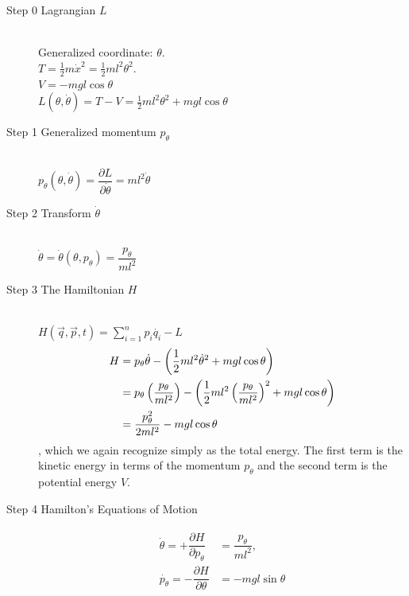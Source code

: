 \begin{description}
\item[Step 0 \quad Lagrangian $L$] \ \\[0.5cm]
Generalized coordinate: $\theta$. \\[0.2cm]
$T = \frac{1}{2} m \dot{x}^2 = \frac{1}{2} m l^2 \theta^2.$ \\[0.2cm]
$V = -m g l \cos{\theta}$ \\[0.2cm]
$L(\theta, \dot{\theta}) = T - V = \frac{1}{2} m l^2 \theta^2 + m g l \cos{\theta}$

\item[Step 1 \quad Generalized momentum $p_\theta$] \ \\[0.2cm]
$p_\theta(\theta,\dot{\theta}) = \dfrac{\partial L}{\partial \dot{\theta}} = m l^2 \dot{\theta}$

\item[Step 2 \quad Transform $\dot{\theta}$] \ \\[0.5cm]
$\dot{\theta} = \dot{\theta}(\theta, p_\theta) = \dfrac{p_\theta}{m l^2}$

\item[Step 3 \quad The Hamiltonian $H$] \ \\[0.5cm]
$H(\vec{q}, \vec{p}, t) = \sum\limits_{i=1}^n p_i \dot{q_i} - L$ \\[0.5cm]
\begin{align}
\notag H &= p_\theta \dot{\theta} - \left(\dfrac{1}{2} m l^2 \dot{\theta}^2 + m g l \cos{\theta}\right) \\
\notag &= p_\theta \left(\dfrac{p_\theta}{m l^2} \right) - \left(\dfrac{1}{2} m l^2 \left(\dfrac{p_\theta}{m l^2}\right)^2 + m g l \cos{\theta}\right) \\
&= \dfrac{p_\theta^2}{2 m l^2} - m g l \cos{\theta}
\end{align} 
, which we again recognize simply as the total energy. The first term is the kinetic energy in terms of the momentum $p_\theta$ and the second term is the potential energy $V$.

\item[Step 4 \quad Hamilton's Equations of Motion]
\begin{align}
\begin{split}
\label{eq:pe-eom}
\dot{\theta} = +\dfrac{\partial H}{\partial p_\theta} &= \dfrac{p_\theta}{m l^2} ,
\\[0.2cm]
\dot{p_\theta} = -\dfrac{\partial H}{\partial \theta} &= - m g l \sin{\theta}
\end{split}
\end{align}
\end{description}


